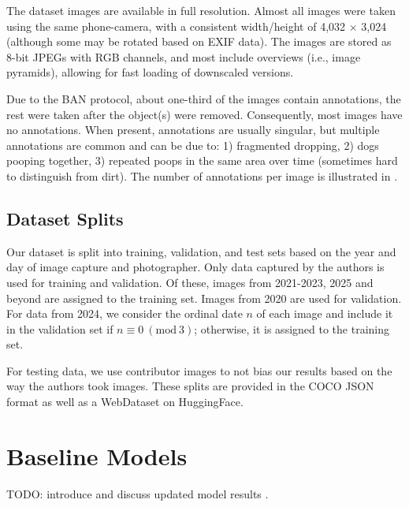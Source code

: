 \documentclass{article}
\begin{document}
The dataset images are available in full resolution.
Almost all images were taken using the same phone-camera, with a consistent width/height of 4,032
  $\times$ 3,024 (although some may be rotated based on EXIF data).
The images are stored as 8-bit JPEGs with RGB channels, and most include overviews (i.e., image pyramids),
  allowing for fast loading of downscaled versions.


Due to the BAN protocol, about one-third of the images contain
annotations, the rest were taken after the object(s) were removed.  Consequently, most
images have no annotations. When present, annotations are usually singular, but
multiple annotations are common and can be due to:
1) fragmented dropping,
2) dogs pooping together,
3) repeated poops in the same area over time (sometimes hard to distinguish from dirt).
The number of annotations per image is illustrated in .


\subsection{Dataset Splits}

Our dataset is split into training, validation, and test sets based on the year and day of image capture and
  photographer.
Only data captured by the authors is used for training and validation.
Of these, images from 2021-2023, 2025 and beyond are assigned to the training set. 
Images from 2020 are used for
  validation.
For data from 2024, we consider the ordinal date $n$ of each image and include it in the validation set if
  $n \equiv 0 \ (\textrm{mod}\ 3)$; otherwise, it is assigned to the training set.


For testing data, we use contributor images to not bias our results based on the way the authors took
  images.
These splits are provided in the COCO JSON format \cite{lin_microsoft_2014} as well as a WebDataset
  \cite{huggingfacewebdataset} on HuggingFace.

\section{Baseline Models}
\label{sec:models}

TODO: introduce and discuss updated model results \cite{wang2024yolov9,liu_grounding_2024,OpenGroundingDino}.
\end{document}
